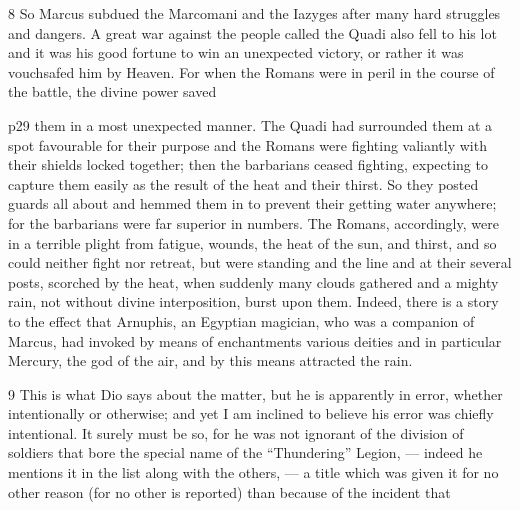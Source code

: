 8
So Marcus subdued the Marcomani and the Iazyges after many hard struggles and dangers. A great war against the people called the Quadi also fell to his lot and it was his good fortune to win an unexpected victory, or rather it was vouchsafed him by Heaven. For when the Romans were in peril in the course of the battle, the divine power saved

p29 them in a most unexpected manner. The Quadi had surrounded them at a spot favourable for their purpose and the Romans were fighting valiantly with their shields locked together; then the barbarians ceased fighting, expecting to capture them easily as the result of the heat and their thirst. So they posted guards all about and hemmed them in to prevent their getting water anywhere; for the barbarians were far superior in numbers. The Romans, accordingly, were in a terrible plight from fatigue, wounds, the heat of the sun, and thirst, and so could neither fight nor retreat, but were standing and the line and at their several posts, scorched by the heat, when suddenly many clouds gathered and a mighty rain, not without divine interposition, burst upon them. Indeed, there is a story to the effect that Arnuphis, an Egyptian magician, who was a companion of Marcus, had invoked by means of enchantments various deities and in particular Mercury, the god of the air, and by this means attracted the rain.

9
This is what Dio says about the matter,\texthebrew{⁠} but he is apparently in error, whether intentionally or otherwise; and yet I am inclined to believe his error was chiefly intentional. It surely must be so, for he was not ignorant of the division of soldiers that bore the special name of the ``Thundering'' Legion, \texthebrew{—} indeed he mentions it in the list along with the others,\texthebrew{⁠ —} a title which was given it for no other reason (for no other is reported) than because of the incident that

